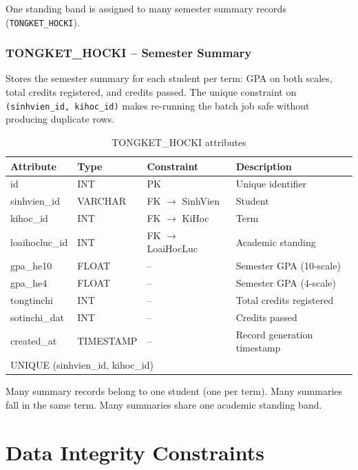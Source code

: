 \documentclass[12pt,a4paper]{report}
\begin{document}
One standing band is assigned to many semester summary records (\texttt{TONGKET\_HOCKI}).

\subsubsection{TONGKET\_HOCKI -- Semester Summary}

Stores the semester summary for each student per term: GPA on both scales, total credits registered, and credits passed. The unique constraint on \texttt{(sinhvien\_id, kihoc\_id)} makes re-running the batch job safe without producing duplicate rows.

\begin{table}[H]
\renewcommand{\arraystretch}{1.35}
\caption{TONGKET\_HOCKI attributes}
\label{tab:tongket}
\begin{tabular}{|p{3.5cm}|p{2.5cm}|p{2.5cm}|p{5cm}|}
  \hline
  \textbf{Attribute} & \textbf{Type} & \textbf{Constraint} & \textbf{Description} \\
  \hline
  id & INT & PK & Unique identifier \\
  \hline
  sinhvien\_id & VARCHAR & FK $\to$ SinhVien & Student \\
  \hline
  kihoc\_id & INT & FK $\to$ KiHoc & Term \\
  \hline
  loaihocluc\_id & INT & FK $\to$ LoaiHocLuc & Academic standing \\
  \hline
  gpa\_he10 & FLOAT & -- & Semester GPA (10-scale) \\
  \hline
  gpa\_he4 & FLOAT & -- & Semester GPA (4-scale) \\
  \hline
  tongtinchi & INT & -- & Total credits registered \\
  \hline
  sotinchi\_dat & INT & -- & Credits passed \\
  \hline
  created\_at & TIMESTAMP & -- & Record generation timestamp \\
  \hline
  \multicolumn{4}{|l|}{UNIQUE (sinhvien\_id, kihoc\_id)} \\
  \hline
\end{tabular}
\end{table}

Many summary records belong to one student (one per term). Many summaries fall in the same term. Many summaries share one academic standing band.

\section{Data Integrity Constraints}
\end{document}
